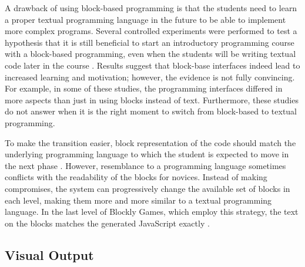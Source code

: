 A drawback of using block-based programming
  is that the students need to learn a proper textual programming language in
  the future to be able to implement more complex programs.
Several controlled experiments were performed to test a hypothesis
  that it is still beneficial to start an introductory programming course
  with a block-based programming,
  even when the students will be writing textual code later in the course
  \cite{comparing-blocks-text-price2015, comparing-blocks-text-weintrop2017}.
Results suggest that block-base interfaces indeed lead to increased learning and
motivation; however, the evidence is not fully convincing. For example, in
some of these studies, the programming interfaces differed in more aspects than
just in using blocks instead of text. Furthermore, these studies do not
answer when it is the right moment to switch from block-based to textual
programming.

To make the transition easier, block representation of the code
  should match the underlying programming language
  to which the student is expected to move in the next phase
  \cite{challenges-of-blocks-based-environments}.
However, resemblance to a programming language sometimes
  conflicts with the readability of the blocks for novices.
Instead of making compromises,
  the system can progressively change the available set of blocks in each level,
  making them more and more similar to a textual programming language.
In the last level of Blockly Games, which employ this strategy,
  the text on the blocks matches the generated JavaScript exactly
  \cite{blockly-10-things}.



\subsection{Visual Output}
\label{sec:visual-output}

